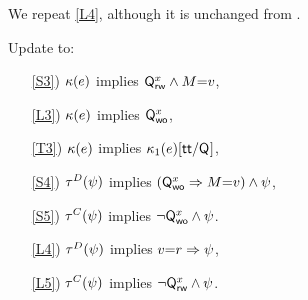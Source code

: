 We repeat \ref{L4}, although it is unchanged from .
\begin{definition}[$\xCO$]
  \label{def:pomsets-co}
  Update  to:
  \begin{enumerate}
  \item[\ref{S3})]
    $\labelingForm(\aEv)$ implies $\Qx{\aLoc}\land\aExp{=}\aVal$,
  \item[\ref{L3})]
    $\labelingForm(\aEv)$ implies $\Qw{\aLoc}$,
  \item[\ref{T3})]
    $\labelingForm(\aEv)$ implies $\labelingForm_1(\aEv)[\TRUE/\Q{}]$,
  \end{enumerate}
  \begin{enumerate}
  \item[\ref{S4})]
    $\aTr{\bEvs}{\bForm}$ implies $(\Qw{\aLoc}\limplies\aExp{=}\aVal)\land\bForm\noSUB{[\aExp/\aLoc]}$,
  \item[\ref{S5})]
    $\aTr{\cEvs}{\bForm}$ implies $\lnot\Qw{\aLoc}\land \bForm\noSUB{[\aExp/\aLoc]}$.
  \item[\ref{L4})]
    $\aTr{\bEvs}{\bForm}$ implies $\aVal{=}\aReg\limplies\bForm$, 
  \item[\ref{L5})]
    $\aTr{\cEvs}{\bForm}$ implies $\lnot\Qx{\aLoc} \land\bForm$.
  \end{enumerate}
\end{definition}



